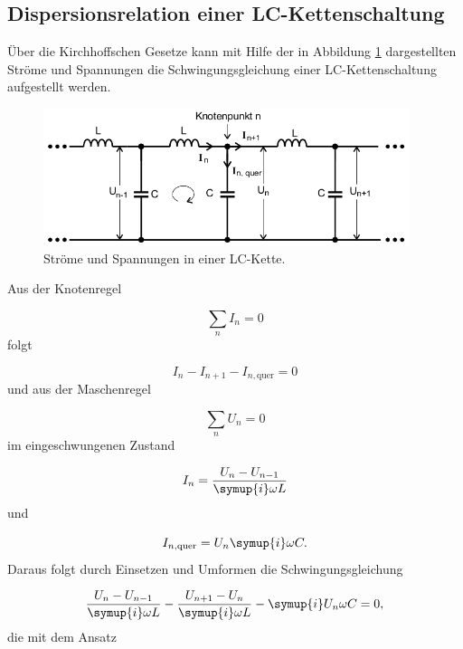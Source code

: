 \subsection{Dispersionsrelation einer LC-Kettenschaltung}

Über die Kirchhoffschen Gesetze kann mit Hilfe der in Abbildung
\ref{fig:KetteLC} dargestellten Ströme und Spannungen die Schwingungsgleichung
einer LC-Kettenschaltung aufgestellt werden.

\begin{figure}
  \centering
  \includegraphics[height=4cm]{KetteLC.png}
  \caption{Ströme und Spannungen in einer LC-Kette.}
  \label{fig:KetteLC}
\end{figure}

Aus der Knotenregel

\begin{equation}
  \sum_{n} I_n = 0
  \label{eqn:Knoten}
\end{equation}
folgt

\begin{equation}
  I_n - I_{n+1} - I_{n,\text{quer}} = 0
\end{equation}
und aus der Maschenregel

\begin{equation}
  \sum_{n} U_n = 0
  \label{eqn:Masche}
\end{equation}
im eingeschwungenen Zustand

\begin{equation}
  I_{n} = \frac{U_{n} - U_{n-1}}{\symup{i} \omega L}
\end{equation}
und

\begin{equation}
  I_{n,\text{quer}} = U_{n} \symup{i} \omega C.
\end{equation}
Daraus folgt durch Einsetzen und Umformen die Schwingungsgleichung

\begin{equation}
  \frac{U_{n} - U_{n-1}}{\symup{i} \omega L} - \frac{U_{n+1} - U_{n}}{\symup{i}
  \omega L} - \symup{i} U_{n} \omega C = 0,
\end{equation}
die mit dem Ansatz

